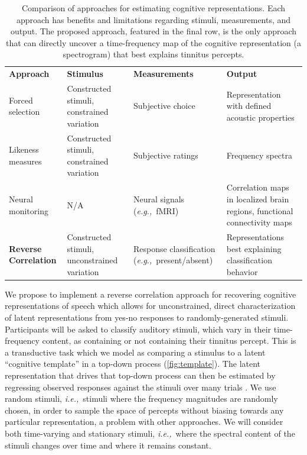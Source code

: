 \documentclass[11pt, notitlepage]{article} %
\newcommand{\myfloatalign}{\centering} %
\def\eg{{\emph{e.g.,}}~}
\def\ie{{\emph{i.e.,}}~}
\begin{document}
\begin{table}[h]
	\myfloatalign
	\begin{tabularx}{\textwidth}{>{\raggedright}p{35mm} >{\raggedright\arraybackslash}p{40mm} >{\raggedright\arraybackslash}p{45mm} >{\raggedright\arraybackslash}p{50mm}}
		\toprule
		\textbf{Approach} & \textbf{Stimulus} & \textbf{Measurements} & \textbf{Output} \\ [0.5ex] 
		\rowcolor{Gray} Forced selection & Constructed stimuli, constrained variation & Subjective choice & Representation with \newline defined acoustic properties \\
		Likeness measures & Constructed stimuli, constrained variation & Subjective ratings & Frequency spectra \\
		\rowcolor{Gray} Neural monitoring & N/A & Neural signals (\eg fMRI) & Correlation maps in localized brain regions, functional connectivity maps \\
		\textbf{Reverse Correlation} & Constructed stimuli, unconstrained variation & Response classification (\eg present/absent) & Representations best explaining classification behavior \\
		\bottomrule
	\end{tabularx}
	\caption[Approaches]{Comparison of approaches for estimating cognitive representations.
	Each approach has benefits and limitations regarding stimuli, measurements, and output.
	The proposed approach, featured in the final row, is the only approach that can directly
	uncover a time-frequency map of the cognitive representation (a spectrogram) that best explains tinnitus percepts.}
	\label{tab:approaches}
\end{table}

We propose to implement a reverse correlation
approach for recovering cognitive representations of speech which allows for unconstrained, direct
characterization of latent representations from yes-no responses to randomly-generated stimuli.
Participants will be asked to classify auditory stimuli,
which vary in their time-frequency content, as containing or not containing their tinnitus percept.
This is a transductive task which we model as comparing a stimulus to a latent ``cognitive template'' in a top-down process
(\autoref{fig:template}).
The latent representation that drives that top-down process
can then be estimated by regressing observed responses against the stimuli over many trials \cite{mineaultImprovedClassificationImages2009}.
We use random stimuli,
\ie stimuli where the frequency magnitudes are randomly chosen, in order to sample the space of percepts without biasing towards any particular representation, a problem with other approaches.
We will consider both time-varying and stationary stimuli, \ie where the spectral content of the stimuli changes over time and where it remains constant.
\end{document}
